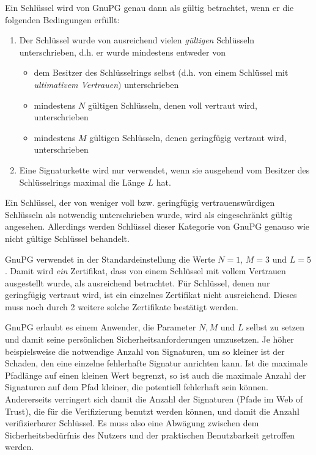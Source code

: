 Ein Schlüssel wird von GnuPG genau dann als gültig betrachtet, wenn er
die folgenden Bedingungen erfüllt:

\begin{enumerate}
\item Der Schlüssel wurde von ausreichend vielen \emph{gültigen} Schlüsseln
  unterschrieben, d.h. er wurde mindestens entweder von
  \begin{itemize}
  \item dem Besitzer des Schlüsselrings selbst (d.h. von einem
    Schlüssel mit \emph{ultimativem Vertrauen}) unterschrieben
  \item mindestens $N$ gültigen Schlüsseln, denen voll vertraut wird, unterschrieben
  \item mindestens $M$ gültigen Schlüsseln, denen geringfügig
    vertraut wird, unterschrieben
  \end{itemize}
\item Eine Signaturkette wird nur verwendet, wenn sie ausgehend vom
  Besitzer des Schlüsselrings maximal die Länge $L$ hat.
\end{enumerate}

Ein Schlüssel, der von weniger voll bzw. geringfügig
vertrauenswürdigen Schlüsseln als notwendig unterschrieben wurde, wird
als eingeschränkt gültig angesehen. Allerdings werden Schlüssel dieser
Kategorie von GnuPG genauso wie nicht gültige Schlüssel behandelt.

GnuPG verwendet in der Standardeinstellung die Werte $N=1$, $M=3$ und
$L=5$. Damit wird \emph{ein} Zertifikat, dass von einem Schl\"ussel
mit vollem Vertrauen ausgestellt wurde, als ausreichend
betrachtet. F\"ur Schl\"ussel, denen nur geringf\"ugig vertraut wird,
ist ein einzelnes Zertifikat nicht ausreichend. Dieses muss noch durch
2 weitere solche Zertifikate best\"atigt werden. 

GnuPG erlaubt es einem Anwender, die Parameter $N, M$ und $L$ selbst
zu setzen und damit seine pers\"onlichen Sicherheitsanforderungen
umzusetzen. Je höher beispielsweise die notwendige Anzahl von
Signaturen, um so kleiner ist der Schaden, den eine einzelne
fehlerhafte Signatur anrichten kann. Ist die maximale Pfadlänge auf
einen kleinen Wert begrenzt, so ist auch die maximale Anzahl der
Signaturen auf dem Pfad kleiner, die potentiell fehlerhaft sein
können. Andererseits verringert sich damit die Anzahl der Signaturen
(Pfade im Web of Trust), die für die Verifizierung benutzt werden
können, und damit die Anzahl verifizierbarer Schlüssel. Es muss also
eine Abwägung zwischen dem Sicherheitsbedürfnis des Nutzers und der
praktischen Benutzbarkeit getroffen werden.

